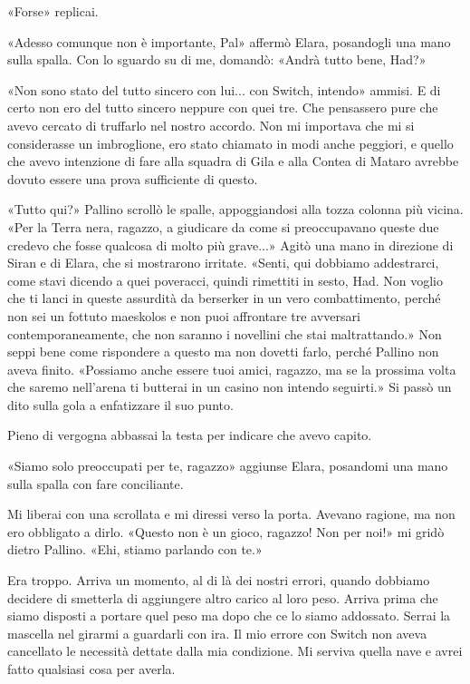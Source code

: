 «Forse» replicai.

«Adesso comunque non è importante, Pal» affermò Elara, posandogli una
mano sulla spalla. Con lo sguardo su di me, domandò: «Andrà tutto bene,
Had?»

«Non sono stato del tutto sincero con lui... con Switch, intendo»
ammisi. E di certo non ero del tutto sincero neppure con quei tre. Che
pensassero pure che avevo cercato di truffarlo nel nostro accordo. Non
mi importava che mi si considerasse un imbroglione, ero stato chiamato
in modi anche peggiori, e quello che avevo intenzione di fare alla
squadra di Gila e alla Contea di Mataro avrebbe dovuto essere una prova
sufficiente di questo.

«Tutto qui?» Pallino scrollò le spalle, appoggiandosi alla tozza colonna
più vicina. «Per la Terra nera, ragazzo, a giudicare da come si
preoccupavano queste due credevo che fosse qualcosa di molto più
grave...» Agitò una mano in direzione di Siran e di Elara, che si
mostrarono irritate. «Senti, qui dobbiamo addestrarci, come stavi
dicendo a quei poveracci, quindi rimettiti in sesto, Had. Non voglio che
ti lanci in queste assurdità da berserker in un vero combattimento,
perché non sei un fottuto maeskolos e non puoi affrontare tre avversari
contemporaneamente, che non saranno i novellini che stai maltrattando.»
Non seppi bene come rispondere a questo ma non dovetti farlo, perché
Pallino non aveva finito. «Possiamo anche essere tuoi amici, ragazzo, ma
se la prossima volta che saremo nell'arena ti butterai in un casino non
intendo seguirti.» Si passò un dito sulla gola a enfatizzare il suo
punto.

Pieno di vergogna abbassai la testa per indicare che avevo capito.

«Siamo solo preoccupati per te, ragazzo» aggiunse Elara, posandomi una
mano sulla spalla con fare conciliante.

Mi liberai con una scrollata e mi diressi verso la porta. Avevano
ragione, ma non ero obbligato a dirlo. «Questo non è un gioco, ragazzo!
Non per noi!» mi gridò dietro Pallino. «Ehi, stiamo parlando con te.»

Era troppo. Arriva un momento, al di là dei nostri errori, quando
dobbiamo decidere di smetterla di aggiungere altro carico al loro peso.
Arriva prima che siamo disposti a portare quel peso ma dopo che ce lo
siamo addossato. Serrai la mascella nel girarmi a guardarli con ira. Il
mio errore con Switch non aveva cancellato le necessità dettate dalla
mia condizione. Mi serviva quella nave e avrei fatto qualsiasi cosa per
averla.

